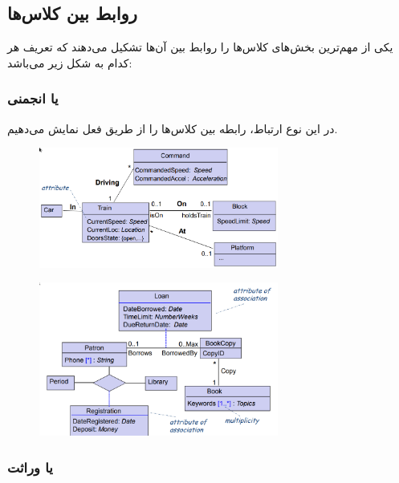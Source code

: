 \subsection{روابط بین کلاس‌ها}

یکی از مهم‌ترین بخش‌های کلاس‌ها را روابط بین آن‌ها تشکیل می‌دهند که تعریف هر
کدام به شکل زیر می‌باشد:

\subsubsection{ یا انجمنی}

در این نوع ارتباط، رابطه بین کلاس‌ها را از طریق فعل نمایش می‌دهیم.

\begin{figure}[H]
    \centering
    \includegraphics[width=0.7\textwidth]{images/association_diagram.png}
    \caption{}
\end{figure}

\begin{figure}[H]
    \centering
    \includegraphics[width=0.7\textwidth]{images/association_diagram_2.png}
    \caption{}
\end{figure}

\subsubsection{ یا وراثت}

